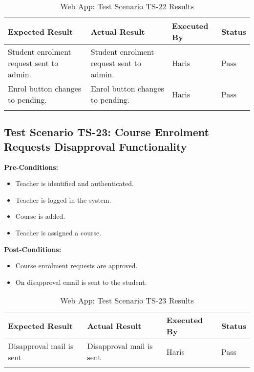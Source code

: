 \bigskip

\begin{longtable}{|p{4cm}|p{4cm}|p{2cm}|p{2cm}|}
\hline
\textbf{Expected Result} & \textbf{Actual Result} & \textbf{Executed By} & \textbf{Status}\\
\hline
Student enrolment request sent to admin. &
Student enrolment request sent to admin. &
Haris &
Pass \\

Enrol button changes to pending. &
Enrol button changes to pending. &
Haris &
Pass \\

\hline

\caption{Web App: Test Scenario TS-22 Results}
\end{longtable}



\subsection{Test Scenario TS-23: Course Enrolment Requests Disapproval Functionality}

\textbf{Pre-Conditions: }
\begin{itemize}

\item Teacher is identified and authenticated.
\item Teacher is logged in the system.
\item Course is added.
\item Teacher is assigned a course.

\end{itemize}

\textbf{Post-Conditions: }
\begin{itemize}
\item Course enrolment requests are approved.
\item On disapproval email is sent to the student.

\end{itemize}


\bigskip

\begin{longtable}{|p{4cm}|p{4cm}|p{2cm}|p{2cm}|}
\hline
\textbf{Expected Result} & \textbf{Actual Result} & \textbf{Executed By} & \textbf{Status}\\
\hline
Disapproval mail is sent &
Disapproval mail is sent &
Haris &
Pass \\
\hline

\caption{Web App: Test Scenario TS-23 Results}
\end{longtable}

